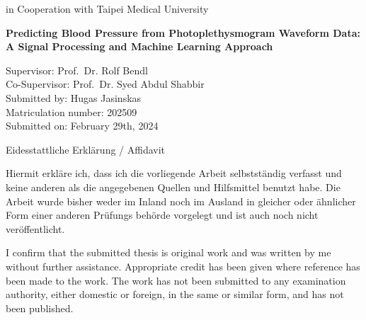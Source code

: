 \documentclass[12pt, bibliography=totoc]{scrartcl}
\begin{document}
\begin{titlepage}
\begin{center}
            \vspace{0.5cm}
            \Large
            in Cooperation with Taipei Medical University

            \hrulefill

            \vspace{1cm}

            \Huge
            \textbf{Predicting Blood Pressure from Photoplethysmogram Waveform Data: A Signal Processing and
            Machine Learning Approach}

        \end{center}

        \vfill
        \Large
        \noindent
        Supervisor: \tab\hspace{-1cm} Prof.\ Dr. Rolf Bendl\\
        Co-Supervisor: \tab\hspace{-1cm} Prof.\ Dr. Syed Abdul Shabbir\\
        Submitted by: \tab\hspace{-1cm} Hugas Jasinskas\\
        Matriculation number: \tab\hspace{-1cm} 202509\\
        Submitted on: \tab\hspace{-1cm} February 29th, 2024\\

    \end{titlepage}

    \newpage

    \begin{Huge}
        \centerline{Eidesstattliche Erklärung / Affidavit}
    \end{Huge}

    \vspace{2cm}

    \begin{Large}

        Hiermit erkläre ich, dass ich die vorliegende Arbeit selbst\-ständig verfasst und keine anderen als die angegebenen Quellen und Hilfsmittel benutzt habe.
        Die Arbeit wurde bisher weder im Inland noch im Ausland in gleicher oder ähnlicher Form einer anderen Prüfungs behörde vor\-gelegt und ist auch noch nicht veröffentlicht.

        \vspace{1cm}

        I confirm that the submitted thesis is original work and was written by me without further assistance.
        Appro\-priate credit has been given where reference has been made to the work.
        The work has not been submitted to any examination authority, either domestic or foreign, in the same or similar form, and has not been published.

    \end{Large}
\end{document}
